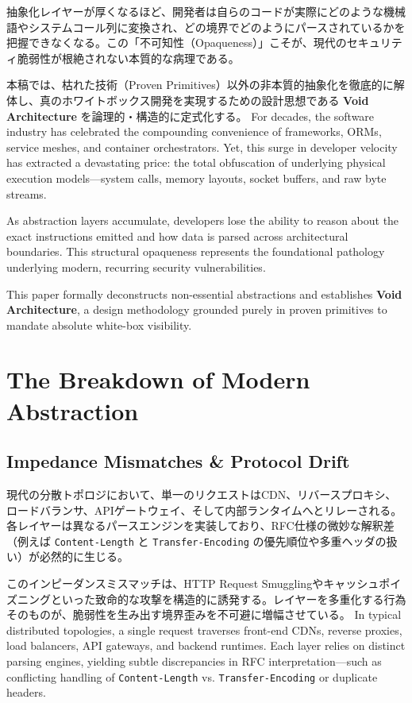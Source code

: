 \documentclass[10pt,a4paper,twocolumn]{article}
\newif\ifja
\begin{document}
抽象化レイヤーが厚くなるほど、開発者は自らのコードが実際にどのような機械語やシステムコール列に変換され、どの境界でどのようにパースされているかを把握できなくなる。この「不可知性（Opaqueness）」こそが、現代のセキュリティ脆弱性が根絶されない本質的な病理である。

本稿では、枯れた技術（Proven Primitives）以外の非本質的抽象化を徹底的に解体し、真のホワイトボックス開発を実現するための設計思想である \textbf{Void Architecture\texttrademark} を論理的・構造的に定式化する。
\else
For decades, the software industry has celebrated the compounding convenience of frameworks, ORMs, service meshes, and container orchestrators. Yet, this surge in developer velocity has extracted a devastating price: the total obfuscation of underlying physical execution models—system calls, memory layouts, socket buffers, and raw byte streams.

As abstraction layers accumulate, developers lose the ability to reason about the exact instructions emitted and how data is parsed across architectural boundaries. This structural opaqueness represents the foundational pathology underlying modern, recurring security vulnerabilities.

This paper formally deconstructs non-essential abstractions and establishes \textbf{Void Architecture\texttrademark}, a design methodology grounded purely in proven primitives to mandate absolute white-box visibility.
\fi

\section{
\ifja 現代的抽象化の構造的破綻 \else The Breakdown of Modern Abstraction \fi
}

\subsection{
\ifja プロトコル解釈の乖離とインピーダンスミスマッチ \else Impedance Mismatches \& Protocol Drift \fi
}
\ifja
現代の分散トポロジにおいて、単一のリクエストはCDN、リバースプロキシ、ロードバランサ、APIゲートウェイ、そして内部ランタイムへとリレーされる。各レイヤーは異なるパースエンジンを実装しており、RFC仕様の微妙な解釈差（例えば \texttt{Content-Length} と \texttt{Transfer-Encoding} の優先順位や多重ヘッダの扱い）が必然的に生じる。

このインピーダンスミスマッチは、HTTP Request Smugglingやキャッシュポイズニングといった致命的な攻撃を構造的に誘発する。レイヤーを多重化する行為そのものが、脆弱性を生み出す境界歪みを不可避に増幅させている。
\else
In typical distributed topologies, a single request traverses front-end CDNs, reverse proxies, load balancers, API gateways, and backend runtimes. Each layer relies on distinct parsing engines, yielding subtle discrepancies in RFC interpretation—such as conflicting handling of \texttt{Content-Length} vs. \texttt{Transfer-Encoding} or duplicate headers.
\end{document}

